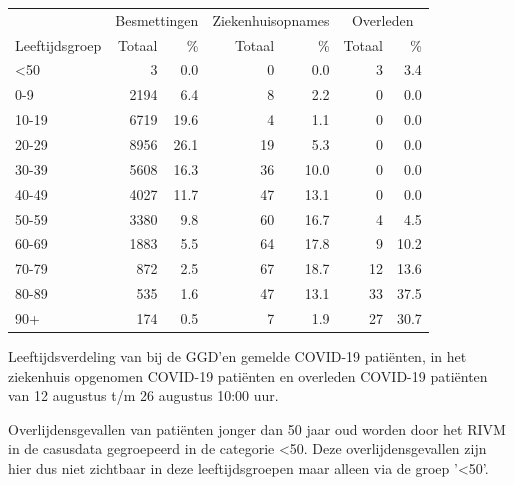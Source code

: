 \documentclass[
  english,
  man,floatsintext]{apa6}
\begin{document}
\begin{table}
\centering\begingroup\fontsize{11}{13}\selectfont

\begin{threeparttable}
\begin{tabular}{lrrrrrr}
\toprule
\multicolumn{1}{c}{ } & \multicolumn{2}{c}{Besmettingen} & \multicolumn{2}{c}{Ziekenhuisopnames} & \multicolumn{2}{c}{Overleden} \\
\cmidrule(l{3pt}r{3pt}){2-3} \cmidrule(l{3pt}r{3pt}){4-5} \cmidrule(l{3pt}r{3pt}){6-7}
Leeftijdsgroep & Totaal & \% & Totaal & \% & Totaal & \%\\
\midrule
<50 & 3 & 0.0 & 0 & 0.0 & 3 & 3.4\\
0-9 & 2194 & 6.4 & 8 & 2.2 & 0 & 0.0\\
10-19 & 6719 & 19.6 & 4 & 1.1 & 0 & 0.0\\
20-29 & 8956 & 26.1 & 19 & 5.3 & 0 & 0.0\\
30-39 & 5608 & 16.3 & 36 & 10.0 & 0 & 0.0\\
40-49 & 4027 & 11.7 & 47 & 13.1 & 0 & 0.0\\
50-59 & 3380 & 9.8 & 60 & 16.7 & 4 & 4.5\\
60-69 & 1883 & 5.5 & 64 & 17.8 & 9 & 10.2\\
70-79 & 872 & 2.5 & 67 & 18.7 & 12 & 13.6\\
80-89 & 535 & 1.6 & 47 & 13.1 & 33 & 37.5\\
90+ & 174 & 0.5 & 7 & 1.9 & 27 & 30.7\\
\bottomrule
\end{tabular}
\begin{tablenotes}
\item[1] Leeftijdsverdeling van bij de GGD’en gemelde COVID-19 patiënten, in het ziekenhuis opgenomen COVID-19 patiënten en overleden COVID-19 patiënten van 12 augustus t/m 26 augustus 10:00 uur.
\item[2] Overlijdensgevallen van patiënten jonger dan 50 jaar oud worden door het RIVM in de casusdata gegroepeerd in de categorie <50. Deze overlijdensgevallen zijn hier dus niet zichtbaar in deze leeftijdsgroepen maar alleen via de groep '<50'.
\end{tablenotes}
\end{threeparttable}
\endgroup{}
\end{table}

\newpage
\end{document}
